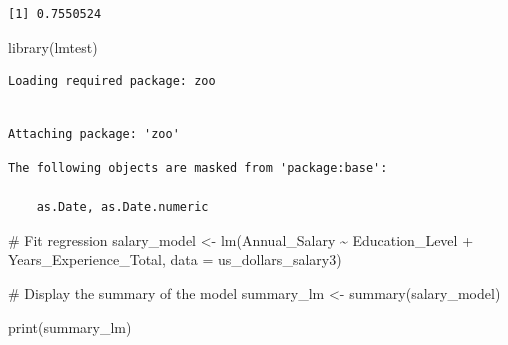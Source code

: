 \documentclass[
  letterpaper,
  DIV=11,
  numbers=noendperiod]{scrartcl}
\newenvironment{Shaded}{\begin{snugshade}}{\end{snugshade}}
\newcommand{\AttributeTok}[1]{\textcolor[rgb]{0.40,0.45,0.13}{#1}}
\newcommand{\CommentTok}[1]{\textcolor[rgb]{0.37,0.37,0.37}{#1}}
\newcommand{\FunctionTok}[1]{\textcolor[rgb]{0.28,0.35,0.67}{#1}}
\newcommand{\NormalTok}[1]{\textcolor[rgb]{0.00,0.23,0.31}{#1}}
\newcommand{\OtherTok}[1]{\textcolor[rgb]{0.00,0.23,0.31}{#1}}
\newcommand{\SpecialCharTok}[1]{\textcolor[rgb]{0.37,0.37,0.37}{#1}}
\begin{document}
\begin{verbatim}
[1] 0.7550524
\end{verbatim}

\begin{Shaded}
\begin{Highlighting}[]
\FunctionTok{library}\NormalTok{(lmtest)}
\end{Highlighting}
\end{Shaded}

\begin{verbatim}
Loading required package: zoo
\end{verbatim}

\begin{verbatim}

Attaching package: 'zoo'
\end{verbatim}

\begin{verbatim}
The following objects are masked from 'package:base':

    as.Date, as.Date.numeric
\end{verbatim}

\begin{Shaded}
\begin{Highlighting}[]
\CommentTok{\# Fit regression}
\NormalTok{salary\_model }\OtherTok{\textless{}{-}} \FunctionTok{lm}\NormalTok{(Annual\_Salary }\SpecialCharTok{\textasciitilde{}}\NormalTok{ Education\_Level }\SpecialCharTok{+}\NormalTok{ Years\_Experience\_Total,}
                   \AttributeTok{data =}\NormalTok{ us\_dollars\_salary3)}

\CommentTok{\# Display the summary of the model}
\NormalTok{summary\_lm }\OtherTok{\textless{}{-}} \FunctionTok{summary}\NormalTok{(salary\_model)}

\FunctionTok{print}\NormalTok{(summary\_lm)}
\end{Highlighting}
\end{Shaded}
\end{document}
